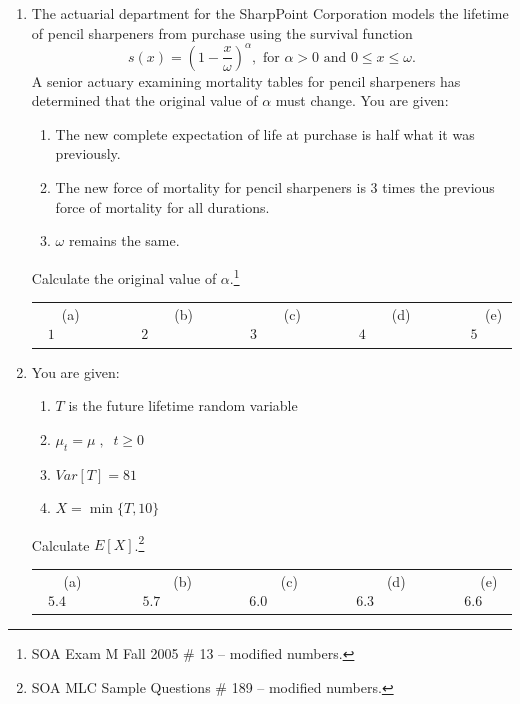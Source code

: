 \documentclass[11pt,fleqn,oneside]{book}
\begin{document}
\begin{enumerate}
\normalsize
\item The actuarial department for the SharpPoint Corporation models the lifetime of pencil sharpeners from purchase using the survival function
$$
s(x) = \left(1 - \frac{x}{\omega}\right)^{\alpha}, \text{ for }\alpha >0 \text{ and } 0 \leq x \leq \omega.
$$
A senior actuary examining mortality tables for pencil sharpeners has determined that the original value of $\alpha$ must change. You are given:
\begin{enumerate}
\item The new complete expectation of life at purchase is half what it was previously.
\item The new force of mortality for pencil sharpeners is 3 times the previous force of mortality for all durations.
\item $\omega$ remains the same.
\end{enumerate}
Calculate the original value of $\alpha$.\footnote[3]{SOA Exam M Fall 2005 \# 13 -- modified numbers.}

\vspace{0.25cm}
\small
\begin{center}
\begin{tabular}{c c c c c}
(a) $1\;\;\;\;\;\;\;\;\;\;$ & 
$\;\;\;\;\;\;\;\;\;\;$(b) $2\;\;\;\;\;\;\;\;\;\;$ &
$\;\;\;\;\;\;\;\;\;\;$(c) $3\;\;\;\;\;\;\;\;\;\;$ & 
$\;\;\;\;\;\;\;\;\;\;$(d) $4 \;\;\;\;\;\;\;\;\;\;$ &
$\;\;\;\;\;\;\;\;\;\;$(e) $5$ 
\end{tabular}
\end{center}
\vspace{0.1cm}

\newpage
\normalsize

\item You are given:
\begin{enumerate}
\item $T$ is the future lifetime random variable
\item $\mu_t=\mu\;,\;\;t \geq 0$
\item $Var[T] = 81$
\item $X=\min\{T,10\}$
\end{enumerate}
Calculate $E[X]$.\footnote[4]{SOA MLC Sample Questions \# 189 -- modified numbers.}

\vspace{0.35cm}
\small
\begin{center}
\begin{tabular}{c c c c c}
(a) $5.4\;\;\;\;\;\;\;\;$ & 
$\;\;\;\;\;\;\;\;$(b) $5.7\;\;\;\;\;\;\;\;$ &
$\;\;\;\;\;\;\;\;$(c) $6.0\;\;\;\;\;\;\;\;$ & 
$\;\;\;\;\;\;\;\;$(d) $6.3 \;\;\;\;\;\;\;\;$ &
$\;\;\;\;\;\;\;\;$(e) $6.6$ 
\end{tabular}
\end{center}


\end{enumerate}
\end{document}
